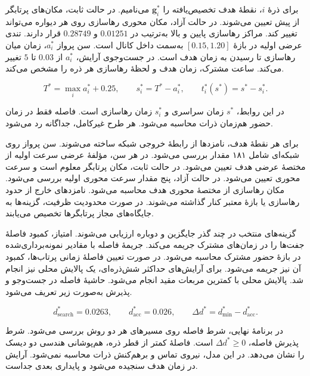 \label{sec:formation-objective}

برای ذرهٔ $i$، نقطهٔ هدف تخصیص‌یافته را $\mathbf g_i^*$ می‌نامیم.
در حالت ثابت، مکان‌های پرتابگر از پیش تعیین می‌شوند.
در حالت آزاد، مکان محوری رهاسازی روی هر دیواره می‌تواند تغییر کند.
مراکز رهاسازی پایین و بالا به‌ترتیب در $0.01251$ و $0.28749$ قرار دارند.
تندی عرضی اولیه در بازهٔ $[0.15,1.20]$ به‌سمت داخل کانال است.
سن پرواز $a_i^*$، زمان میان رهاسازی تا رسیدن به زمان هدف است.
در جست‌وجوی آرایش، $a_i^*$ از $0.03$ تا $5$ تغییر می‌کند.
ساعت مشترک، زمان هدف و لحظهٔ رهاسازی هر ذره را مشخص می‌کند.

\begin{equation}
T^*=\max_i a_i^*+0.25,\qquad
s_i^*=T^*-a_i^*,\qquad t_i^*(s^*)=s^*-s_i^* .
\label{eq:formation-common-clock}
\end{equation}

در این روابط، $s^*$ زمان سراسری و $s_i^*$ زمان رهاسازی است.
فاصله فقط در زمان حضور هم‌زمان ذرات محاسبه می‌شود.
هر طرح غیرکامل، جداگانه رد می‌شود.

\label{sec:formation-release-modes}

برای هر نقطهٔ هدف، نامزدها از رابطهٔ خروجی شبکه ساخته می‌شوند.
سن پرواز روی شبکه‌ای شامل ۱۸۱ مقدار بررسی می‌شود.
در هر سن، مؤلفهٔ عرضی سرعت اولیه از مختصهٔ عرضی هدف تعیین می‌شود.
در حالت ثابت، مکان پرتابگر معلوم است و سرعت محوری تعیین می‌شود.
در حالت آزاد، پنج مقدار سرعت محوری اولیه بررسی می‌شود.
مکان رهاسازی از مختصهٔ محوری هدف محاسبه می‌شود.
نامزدهای خارج از حدود رهاسازی یا بازهٔ معتبر کنار گذاشته می‌شوند.
در صورت محدودیت ظرفیت، گزینه‌ها به جایگاه‌های مجاز پرتابگرها تخصیص می‌یابند.

گزینه‌های منتخب در چند گذر جایگزین و دوباره ارزیابی می‌شوند.
امتیاز، کمبود فاصلهٔ جفت‌ها را در زمان‌های مشترک جریمه می‌کند.
جریمهٔ فاصله با مقادیر نمونه‌برداری‌شده در بازهٔ حضور مشترک محاسبه می‌شود.
در صورت تعیین فاصلهٔ زمانی پرتاب‌ها، کمبود آن نیز جریمه می‌شود.
برای آرایش‌های حداکثر شش‌ذره‌ای، یک پالایش محلی نیز انجام شد.
پالایش محلی با کمترین مربعات مقید انجام می‌شود.
حاشیهٔ فاصله در جست‌وجو و پذیرش به‌صورت زیر تعریف می‌شود.

\begin{equation}
d_{\mathrm{search}}^*=0.0263,\qquad
d_{\mathrm{acc}}^*=0.026,\qquad
\Delta d^*=d_{\min}^*-d_{\mathrm{acc}}^* .
\label{eq:formation-clearance-thresholds}
\end{equation}

در برنامهٔ نهایی، شرط فاصله روی مسیرهای هر دو روش بررسی می‌شود.
شرط پذیرش فاصله، $\Delta d^*\geq 0$ است.
فاصلهٔ کمتر از قطر ذره، هم‌پوشانی هندسی دو دیسک را نشان می‌دهد.
در این مدل، نیروی تماس و برهم‌کنش ذرات محاسبه نمی‌شود.
آرایش در زمان هدف سنجیده می‌شود و پایداری بعدی جداست.

